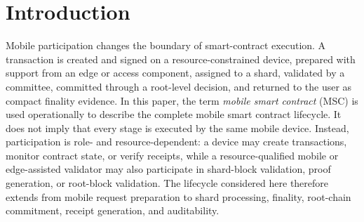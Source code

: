 \documentclass[a4paper,fleqn]{cas-sc}
\begin{document}
\maketitle
{}
\normalsize

\section{Introduction}
\label{sec:introduction}

Mobile participation changes the boundary of smart-contract execution. A transaction is created and signed on a resource-constrained device, prepared with support from an edge or access component, assigned to a shard, validated by a committee, committed through a root-level decision, and returned to the user as compact finality evidence. In this paper, the term \emph{mobile smart contract} (MSC) is used operationally to describe the complete mobile smart contract lifecycle. It does not imply that every stage is executed by the same mobile device. Instead, participation is role- and resource-dependent: a device may create transactions, monitor contract state, or verify receipts, while a resource-qualified mobile or edge-assisted validator may also participate in shard-block validation, proof generation, or root-block validation. The lifecycle considered here therefore extends from mobile request preparation to shard processing, finality, root-chain commitment, receipt generation, and auditability. 
\end{document}
